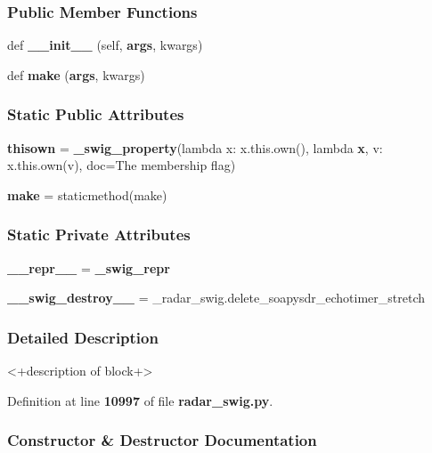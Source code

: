\subsubsection*{Public Member Functions}
\begin{DoxyCompactItemize}
\item 
def {\bf \+\_\+\+\_\+init\+\_\+\+\_\+} (self, {\bf args}, kwargs)
\item 
def {\bf make} ({\bf args}, kwargs)
\end{DoxyCompactItemize}
\subsubsection*{Static Public Attributes}
\begin{DoxyCompactItemize}
\item 
{\bf thisown} = {\bf \+\_\+swig\+\_\+property}(lambda x\+: x.\+this.\+own(), lambda {\bf x}, v\+: x.\+this.\+own(v), doc=\textquotesingle{}The membership flag\textquotesingle{})
\item 
{\bf make} = staticmethod(make)
\end{DoxyCompactItemize}
\subsubsection*{Static Private Attributes}
\begin{DoxyCompactItemize}
\item 
{\bf \+\_\+\+\_\+repr\+\_\+\+\_\+} = {\bf \+\_\+swig\+\_\+repr}
\item 
{\bf \+\_\+\+\_\+swig\+\_\+destroy\+\_\+\+\_\+} = \+\_\+radar\+\_\+swig.\+delete\+\_\+soapysdr\+\_\+echotimer\+\_\+stretch
\end{DoxyCompactItemize}


\subsubsection{Detailed Description}
\begin{DoxyVerb}<+description of block+>\end{DoxyVerb}
 

Definition at line {\bf 10997} of file {\bf radar\+\_\+swig.\+py}.



\subsubsection{Constructor \& Destructor Documentation}
